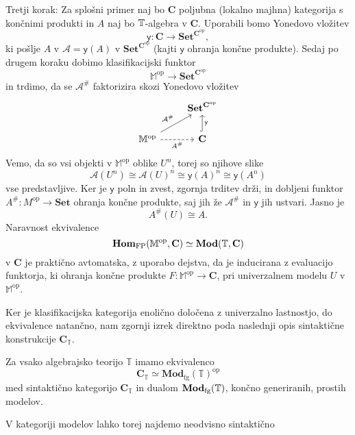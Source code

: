 \documentclass[../kategoricna_logika.tex]{subfiles}
\begin{document}
\begin{dokaz}
  Tretji korak: Za splošni primer naj bo $\mathbf{C}$ poljubna (lokalno majhna) kategorija
  s končnimi produkti in $A$ naj bo $\mathbb{T}$-algebra v $\mathbf{C}$.
  Uporabili bomo Yonedovo vložitev
  \[ \mathsf{y} : \mathbf{C} \to \mathbf{Set}^{\mathbf{C}^{\mathrm{op}}},\]
  ki pošlje $A$ v $\mathcal{A} = \mathsf{y}(A)$ v $\mathbf{Set}^{\mathbf{C}^{\mathrm{op}}}$
  (kajti $\mathsf{y}$ ohranja končne produkte). Sedaj po drugem koraku dobimo klasifikacijski
  funktor
  \[ \mathbb{M}^{\mathrm{op}} \to \mathbf{Set}^{\mathbf{C}^{\mathrm{op}}}\]
  in trdimo, da se $\mathcal{A}^{\#}$ faktorizira skozi Yonedovo vložitev
  \begin{equation*}
    \begin{tikzcd}
      & \mathbf{Set}^{\mathbf{C}^{\mathrm{op}}} \\
      \mathbb{M}^{\mathrm{op}} \ar[ur, "\mathcal{A}^{\#}"] \ar[r, dashed, "A^{\#}"'] &
      \mathbf{C} \ar[u, hook, "\mathsf{y}"']
    \end{tikzcd}
  \end{equation*}
  Vemo, da so vsi objekti v $\mathbb{M}^{\mathrm{op}}$ oblike $U^n$, torej so njihove slike
  \[ \mathcal{A}(U^n) \cong \mathcal{A}(U)^n \cong \mathsf{y}(A)^n \cong \mathsf{y}(A^n)\]
  vse predstavljive. Ker je $\mathsf{y}$ poln in zvest, zgornja trditev drži, in
  dobljeni funktor $A^{\#} : M^{\mathrm{op}} \to \mathbf{Set}$ ohranja končne produkte, saj jih
  že $\mathcal{A}^{\#}$ in $\mathsf{y}$ jih ustvari. Jasno je
  \[ A^{\#}(U) \cong A.\]
  Naravnost ekvivalence
  \[ \mathbf{Hom}_{\mathrm{FP}}(\mathbb{M}^{\mathrm{op}},\mathbf{C}) \simeq \mathbf{Mod}(\mathbb{T}, \mathbf{C})\]
  v $\mathbf{C}$ je praktično avtomatska, z uporabo dejstva, da je inducirana z evaluacijo
  funktorja, ki ohranja končne produkte $F : \mathbb{M}^{\mathrm{op}} \to \mathbf{C}$,
  pri univerzalnem modelu $U$ v $\mathbb{M}^{\mathrm{op}}$.
\end{dokaz}
Ker je klasifikacijska kategorija enolično določena z univerzalno lastnostjo,
do ekvivalence natančno, nam zgornji izrek direktno poda naslednji opis sintaktične
konstrukcije $\mathbf{C}_{\mathbb{T}}$.
\begin{posledica}\label{posledica:logična-dualnost}
Za vsako algebrajsko teorijo \(\mathbb{T}\) imamo ekvivalenco
\[ \mathbf{C}_{\mathbb{T}} \simeq \mathbf{Mod}_{\mathrm{fg}}(\mathbb{T})^{\mathrm{op}} \]
med sintaktično kategorijo \(\mathbf{C}_{\mathbb{T}}\) in dualom
\(\mathbf{Mod}_{\mathrm{fg}}(\mathbb{T})\), končno generiranih,
prostih modelov.
\end{posledica}
V kategoriji modelov lahko torej najdemo neodvisno sintaktično
\end{document}
